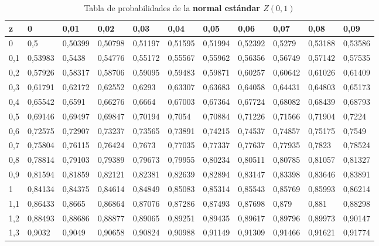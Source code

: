\documentclass[addpoints,spanish, 12pt,a4paper]{exam}
\begin{document}
\begin{table}
\centering

\caption{Tabla de probabilidades de la \textbf{normal estándar $Z(0,1)$}}
\label{my-label}

\begin{tabular}{l|llllllllll}
z   & 0       & 0,01    & 0,02    & 0,03    & 0,04    & 0,05    & 0,06    & 0,07    & 0,08    & 0,09    \\
\hline
0   & 0,5     & 0,50399 & 0,50798 & 0,51197 & 0,51595 & 0,51994 & 0,52392 & 0,5279  & 0,53188 & 0,53586 \\
0,1 & 0,53983 & 0,5438  & 0,54776 & 0,55172 & 0,55567 & 0,55962 & 0,56356 & 0,56749 & 0,57142 & 0,57535 \\
0,2 & 0,57926 & 0,58317 & 0,58706 & 0,59095 & 0,59483 & 0,59871 & 0,60257 & 0,60642 & 0,61026 & 0,61409 \\
0,3 & 0,61791 & 0,62172 & 0,62552 & 0,6293  & 0,63307 & 0,63683 & 0,64058 & 0,64431 & 0,64803 & 0,65173 \\
0,4 & 0,65542 & 0,6591  & 0,66276 & 0,6664  & 0,67003 & 0,67364 & 0,67724 & 0,68082 & 0,68439 & 0,68793 \\
0,5 & 0,69146 & 0,69497 & 0,69847 & 0,70194 & 0,7054  & 0,70884 & 0,71226 & 0,71566 & 0,71904 & 0,7224  \\
0,6 & 0,72575 & 0,72907 & 0,73237 & 0,73565 & 0,73891 & 0,74215 & 0,74537 & 0,74857 & 0,75175 & 0,7549  \\
0,7 & 0,75804 & 0,76115 & 0,76424 & 0,7673  & 0,77035 & 0,77337 & 0,77637 & 0,77935 & 0,7823  & 0,78524 \\
0,8 & 0,78814 & 0,79103 & 0,79389 & 0,79673 & 0,79955 & 0,80234 & 0,80511 & 0,80785 & 0,81057 & 0,81327 \\
0,9 & 0,81594 & 0,81859 & 0,82121 & 0,82381 & 0,82639 & 0,82894 & 0,83147 & 0,83398 & 0,83646 & 0,83891 \\
1   & 0,84134 & 0,84375 & 0,84614 & 0,84849 & 0,85083 & 0,85314 & 0,85543 & 0,85769 & 0,85993 & 0,86214 \\
1,1 & 0,86433 & 0,8665  & 0,86864 & 0,87076 & 0,87286 & 0,87493 & 0,87698 & 0,879   & 0,881   & 0,88298 \\
1,2 & 0,88493 & 0,88686 & 0,88877 & 0,89065 & 0,89251 & 0,89435 & 0,89617 & 0,89796 & 0,89973 & 0,90147 \\
1,3 & 0,9032  & 0,9049  & 0,90658 & 0,90824 & 0,90988 & 0,91149 & 0,91309 & 0,91466 & 0,91621 & 0,91774 \\

\end{tabular}
\end{table}
\end{document}
